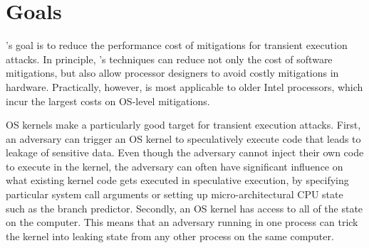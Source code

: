 \section{Goals}

\sys's goal is to reduce the performance cost of mitigations for transient
execution attacks.  In principle, \sys's techniques can reduce not only
the cost of software mitigations, but also allow processor designers
to avoid costly mitigations in hardware.  Practically, however, \sys 
is most applicable to older Intel processors, which incur the largest
costs on OS-level mitigations.




OS kernels make a particularly good target for transient execution attacks.
First, an adversary can trigger an OS kernel to speculatively execute code that
leads to leakage of sensitive data.  Even though the adversary cannot
inject their own code to execute in the kernel, the adversary can often
have significant influence on what existing kernel code gets executed in
speculative execution, by specifying particular system call arguments or
setting up micro-architectural CPU state such as the branch predictor.
Secondly, an OS kernel has access to all of the state
on the computer.  This means that an adversary running in one process
can trick the kernel into leaking state from any other process on the
same computer.


